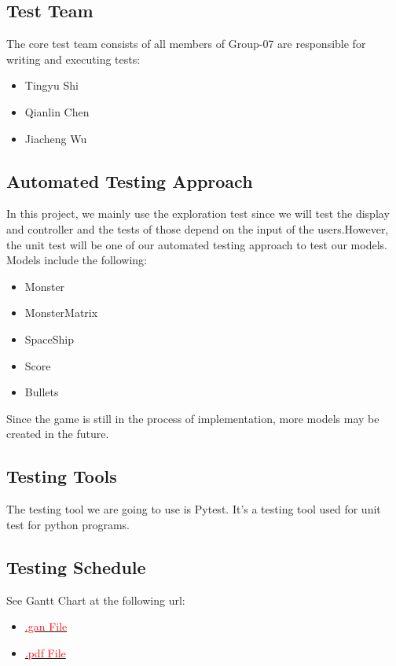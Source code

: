 \documentclass[12pt]{article}
\begin{document}
\subsection{Test Team}
The core test team consists of all members of Group-07 are responsible for writing and executing tests:
\begin{itemize}
\item Tingyu Shi
\item Qianlin Chen
\item Jiacheng Wu
\end{itemize}
\subsection{Automated Testing Approach}
In this project, we mainly use the exploration test since we will test the display and controller and the tests of those depend on the input of the users.However, the unit test will be one of our automated testing approach to test our models. Models include the following:
\begin{itemize}
\item Monster
\item MonsterMatrix
\item SpaceShip
\item Score
\item Bullets
\end{itemize}
Since the game is still in the process of implementation,
more models may be created in the future.
\subsection{Testing Tools}
The testing tool we are going to use is Pytest. It's a testing tool used for unit test for python programs.
\subsection{Testing Schedule}
		
See Gantt Chart at the following url:
\begin{itemize}
\item \href{https://gitlab.cas.mcmaster.ca/shit19/2022_winter_3xa3_l03_g07/-/blob/main/ProjectSchedule/Gantt_Project_TestPlan_Finished.gan}{\textcolor{red}{.gan File}}
\item \href{https://gitlab.cas.mcmaster.ca/shit19/2022_winter_3xa3_l03_g07/-/blob/main/ProjectSchedule/Gantt_Project_TestPlan_Finished.pdf}{\textcolor{red}{.pdf File}}
\end{itemize}
\end{document}
